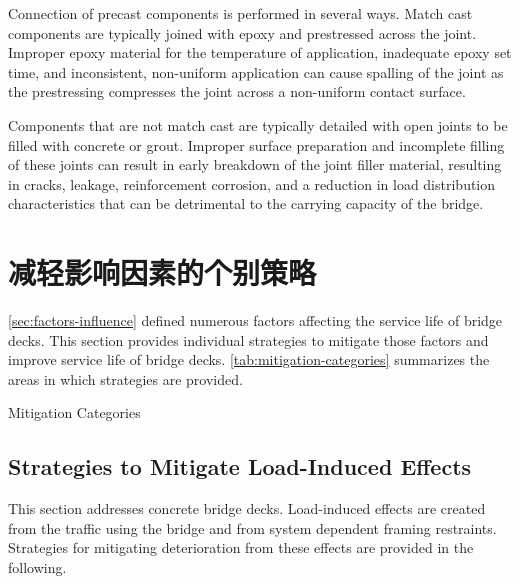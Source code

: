 Connection of precast components is performed in several ways. Match cast components are typically joined with epoxy and prestressed across the joint. Improper epoxy material for the temperature of application, inadequate epoxy set time, and inconsistent, non-uniform application can cause spalling of the joint as the prestressing compresses the joint across a non-uniform contact surface.

Components that are not match cast are typically detailed with open joints to be filled with concrete or grout. Improper surface preparation and incomplete filling of these joints can result in early breakdown of the joint filler material, resulting in cracks, leakage, reinforcement corrosion, and a reduction in load distribution characteristics that can be detrimental to the carrying capacity of the bridge.

\section{减轻影响因素的个别策略}
\label{sec:individual-strategy}
\cref{sec:factors-influence} defined numerous factors affecting the service life of bridge decks. This section provides individual strategies to mitigate those factors and improve service life of bridge decks. \cref{tab:mitigation-categories} summarizes the areas in which strategies are provided.

\begin{table}
  \caption{Mitigation Categories}
  \label{tab:mitigation-categories}
  
\end{table}

\subsection{Strategies to Mitigate Load-Induced Effects}
\label{subsec:strategies-mitigate-load-induced}
This section addresses concrete bridge decks. Load-induced effects are created from the traffic using the bridge and from system dependent framing restraints. Strategies for mitigating deterioration from these effects are provided in the following.

